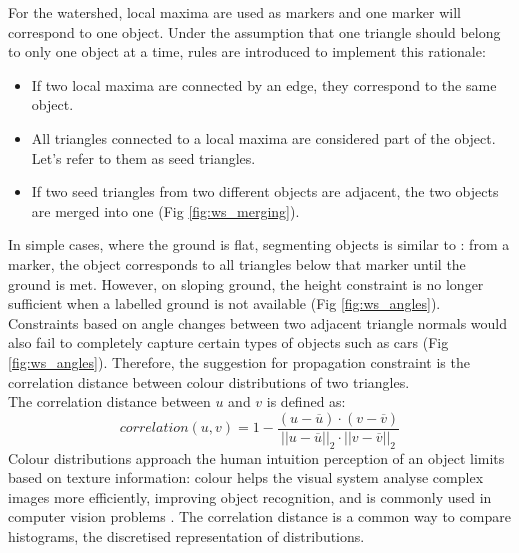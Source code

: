 \documentclass{kththesis}
\begin{document}
For the watershed, local maxima are used as markers and one marker will correspond to one object. Under the assumption that one triangle should belong to only one object at a time, rules are introduced to implement this rationale: 
\begin{itemize}
    \item If two local maxima are connected by an edge, they correspond to the same object. 
    \item All triangles connected to a local maxima are considered part of the object. Let's refer to them as seed triangles. 
    \item If two seed triangles from two different objects are adjacent, the two objects are merged into one (Fig \ref{fig:ws_merging}). 
\end{itemize}
In simple cases, where the ground is flat, segmenting objects is similar to \parencite{HernandezArtefacts}: from a marker, the object corresponds to all triangles below that marker until the ground is met.  However, on sloping ground, the height constraint is no longer sufficient when a labelled ground is not available (Fig \ref{fig:ws_angles}). Constraints based on angle changes between two adjacent triangle normals would also fail to completely capture certain types of objects such as cars (Fig \ref{fig:ws_angles}). Therefore, the suggestion for propagation constraint is the correlation distance between colour distributions of two triangles. \\
The correlation distance between $u$ and $v$ is defined as:
    $$correlation(u,v)=1-\dfrac{(u-\overline{u})\cdot(v-\overline{v})}{||u-\overline{u}||_2\cdot||v-\overline{v}||_2}$$
Colour distributions approach the human intuition perception of an object limits based on texture information:  colour helps the visual system  analyse complex images more efficiently, improving object recognition, and is commonly used in computer vision problems \parencite{hist_intersection}. 
The correlation distance is a common way to compare histograms, the discretised representation of distributions. 
\end{document}
